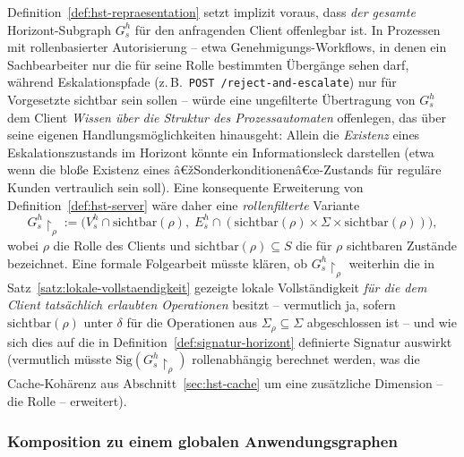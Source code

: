 ﻿\documentclass[a4paper,12pt]{article}
\theoremstyle{definition}
\begin{document}
Definition~\ref{def:hst-repraesentation} setzt implizit voraus, dass \emph{der gesamte}
Horizont-Subgraph $G_s^h$ für den anfragenden Client offenlegbar ist. In Prozessen mit
rollenbasierter Autorisierung -- etwa Genehmigungs-Workflows, in denen ein
Sachbearbeiter nur die für seine Rolle bestimmten Übergänge sehen darf, während
Eskalationspfade (z.\,B.\ \texttt{POST /reject-and-escalate}) nur für Vorgesetzte
sichtbar sein sollen -- würde eine ungefilterte Übertragung von $G_s^h$ dem Client
\emph{Wissen über die Struktur des Prozessautomaten} offenlegen, das über seine eigenen
Handlungsmöglichkeiten hinausgeht: Allein die \emph{Existenz} eines
Eskalationszustands im Horizont könnte ein Informationsleck darstellen (etwa wenn die
bloße Existenz eines â€žSonderkonditionenâ€œ-Zustands für reguläre Kunden vertraulich sein
soll). Eine konsequente Erweiterung von Definition~\ref{def:hst-server} wäre daher eine
\emph{rollenfilterte} Variante
\[
	G_s^h\!\restriction_\rho := \bigl(V_s^h\cap\mathrm{sichtbar}(\rho),\;
	E_s^h\cap(\mathrm{sichtbar}(\rho)\times\Sigma\times\mathrm{sichtbar}(\rho))\bigr),
\]
wobei $\rho$ die Rolle des Clients und $\mathrm{sichtbar}(\rho)\subseteq S$ die für $\rho$
sichtbaren Zustände bezeichnet. Eine formale Folgearbeit müsste klären, ob
$G_s^h\!\restriction_\rho$ weiterhin die in Satz~\ref{satz:lokale-vollstaendigkeit}
gezeigte lokale Vollständigkeit \emph{für die dem Client tatsächlich erlaubten
Operationen} besitzt -- vermutlich ja, sofern $\mathrm{sichtbar}(\rho)$ unter $\delta$
für die Operationen aus $\Sigma_\rho\subseteq\Sigma$ abgeschlossen ist -- und wie sich
dies auf die in Definition~\ref{def:signatur-horizont} definierte Signatur auswirkt
(vermutlich müsste $\mathrm{Sig}(G_s^h\!\restriction_\rho)$ rollenabhängig berechnet
werden, was die Cache-Kohärenz aus Abschnitt~\ref{sec:hst-cache} um eine zusätzliche
Dimension -- die Rolle -- erweitert).

\subsubsection{Komposition zu einem globalen Anwendungsgraphen}
\end{document}
